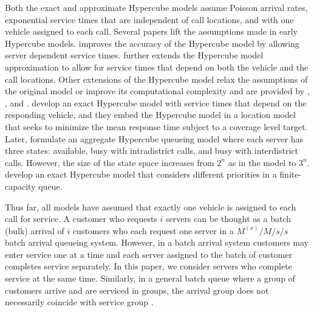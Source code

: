 \documentclass[11pt]{article}\topmargin 0mm
\begin{document}
Both the exact and approximate Hypercube models assume Poisson
arrival rates, exponential service times that are independent
of call locations, and with one vehicle assigned to each call.
Several papers lift the assumptions made in early Hypercube
models. \citet{halpern1977accuracy} improves the accuracy of
the Hypercube model by allowing server dependent service times.
\citet{Jarvis85} further extends the Hypercube model
approximation to allow for service times that depend on both
the vehicle and the call locations.
{\color{blue}
Other extensions of the Hypercube model relax the
assumptions of the original model or improve its computational
complexity and are provided by \cite{chelst1979technical},
\cite{larson1982police}, and \cite{mendoncca2001analysing}.
\citet{geroliminis2009spatial} develop an exact Hypercube model
with service times that depend on the responding vehicle, and
they embed the Hypercube model in a location model that seeks
to minimize the mean response time subject to a
coverage level target. Later, \citet{boyaci2015approximation} formulate an aggregate Hypercube queueing model where each server has three states: available, busy with intradistrict calls, and busy with interdistrict calls. However, the size of the state space increases from $2^n$ as in the \citet{Larson74} model to $3^n$.  \citet{desouza2015incorporating} develop an exact Hypercube model that considers different priorities in a finite-capacity queue.
}

{\color{blue}
Thus far, all models have assumed that exactly one vehicle is
assigned to each call for service.
A customer who requests $i$ servers can be thought as a batch (bulk) arrival of $i$ customers who each request one server in a $M^{(x)}/M/s/s$ batch arrival queueing system. However, in a batch arrival system customers may enter service one at a time and each server assigned to the batch of customer completes service separately. In this paper, we consider servers who complete service at the same time. Similarly, in a general batch queue where a group of customers arrive and are serviced in groups, the arrival group does not necessarily coincide with service group \citep{miller1959contribution}.}
\end{document}
